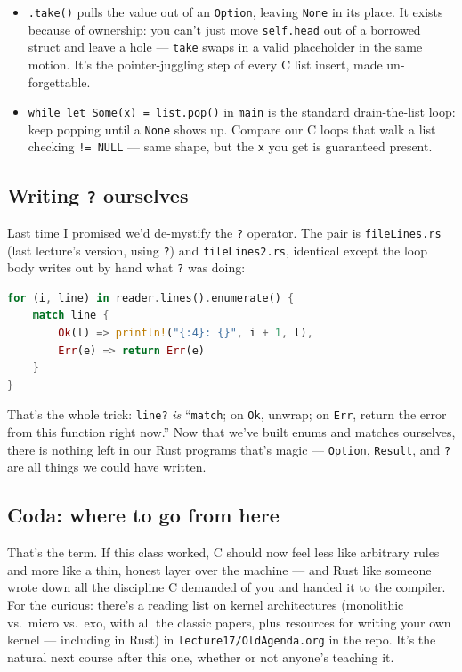 \documentclass[11pt]{article}
\begin{document}
\begin{itemize}
  \item \texttt{.take()} pulls the value out of an \texttt{Option},
    leaving \texttt{None} in its place. It exists because of
    ownership: you can't just move \texttt{self.head} out of a
    borrowed struct and leave a hole --- \texttt{take} swaps in a
    valid placeholder in the same motion. It's the pointer-juggling
    step of every C list insert, made un-forgettable.
  \item \texttt{while let Some(x) = list.pop()} in \texttt{main} is
    the standard drain-the-list loop: keep popping until a
    \texttt{None} shows up. Compare our C loops that walk a list
    checking \texttt{!= NULL} --- same shape, but the \texttt{x} you
    get is guaranteed present.
\end{itemize}

\subsection*{Writing \texttt{?} ourselves}

Last time I promised we'd de-mystify the \texttt{?} operator. The
pair is \texttt{fileLines.rs} (last lecture's version, using
\texttt{?}) and \texttt{fileLines2.rs}, identical except the loop
body writes out by hand what \texttt{?} was doing:

\begin{lstlisting}[language=Rust]
for (i, line) in reader.lines().enumerate() {
    match line {
        Ok(l) => println!("{:4}: {}", i + 1, l),
        Err(e) => return Err(e)
    }
}
\end{lstlisting}

That's the whole trick: \texttt{line?} \emph{is} ``\texttt{match}; on
\texttt{Ok}, unwrap; on \texttt{Err}, return the error from this
function right now.'' Now that we've built enums and matches
ourselves, there is nothing left in our Rust programs that's magic
--- \texttt{Option}, \texttt{Result}, and \texttt{?} are all things
we could have written.

\subsection*{Coda: where to go from here}

That's the term. If this class worked, C should now feel less like
arbitrary rules and more like a thin, honest layer over the machine
--- and Rust like someone wrote down all the discipline C demanded
of you and handed it to the compiler. For the curious: there's a
reading list on kernel architectures (monolithic vs.\ micro vs.\ exo,
with all the classic papers, plus resources for writing your own
kernel --- including in Rust) in
\texttt{lecture17/OldAgenda.org} in the repo. It's the natural next
course after this one, whether or not anyone's teaching it.
\end{document}
